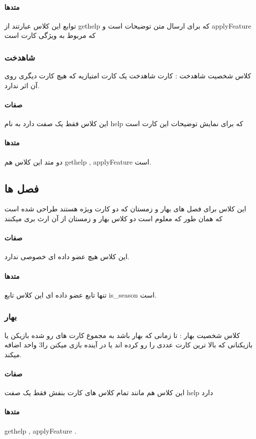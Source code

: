 \documentclass[pdf,titlepage,a4paper]{report}
\begin{document}
	\paragraph{متدها}
	توابع این کلاس عبارتند از  
	gethelp که برای ارسال متن توضیحات است 
	و applyFeature که مربوط به ویژگی کارت است
	\subsubsection{شاهدخت}
	 کلاس شخصیت شاهدخت : کارت شاهدخت یک کارت امتیازیه که هیچ کارت دیگری روی آن اثر ندارد.
	\paragraph{صفات}
	این کلاس فقط یک صفت دارد به نام help  که برای نمایش توضیحات این کارت است
	\paragraph{متدها}
	 دو متد این کلاس هم gethelp , applyFeature است.
	
	\subsection{فصل ها}
    این کلاس برای فصل های بهار و زمستان که دو کارت ویژه هستند طراحی شده است که همان طور که معلوم است دو کلاس بهار و زمستان از آن ارث بری میکنند

	\paragraph{صفات}
	این کلاس هیچ عضو داده ای خصوصی ندارد.
	\paragraph{متدها}
	تنها تابع عضو داده ای این کلاس تابع is_season است.
	\subsubsection{بهار}
	 کلاس شخصیت بهار : تا زمانی که بهار باشد به مجموع کارت های رو شده بازیکن یا بازیکنانی که بالا ترین کارت عددی را رو کرده اند یا  در آینده بازی میکنن را3 واحد اضافه میکند.

	\paragraph{صفات}
	این کلاس هم مانند تمام کلاس های کارت بنفش فقط یک صفت help دارد
	\paragraph{متدها}
	gethelp , applyFeature .
\end{document}
